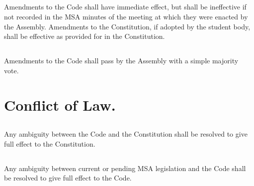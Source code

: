 \subsection{}
Amendments to the Code shall have immediate effect, but shall be ineffective if not recorded in the MSA minutes of the meeting at which they were enacted by the Assembly. Amendments to the Constitution, if adopted by the student body, shall be effective as provided for in the Constitution.

\subsection{}
Amendments to the Code shall pass by the Assembly with a simple majority vote.


\section{Conflict of Law.}

\subsection{}
Any ambiguity between the Code and the Constitution shall be resolved to give full effect to the Constitution.  

\subsection{}
Any ambiguity between current or pending MSA legislation and the Code shall be resolved to give full effect to the Code.

 

